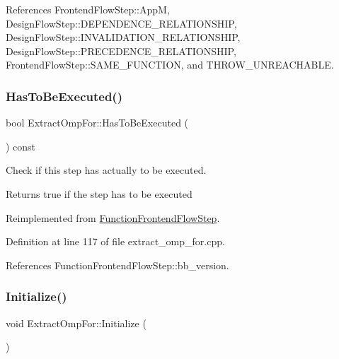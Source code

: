 References Frontend\+Flow\+Step\+::\+AppM, Design\+Flow\+Step\+::\+D\+E\+P\+E\+N\+D\+E\+N\+C\+E\+\_\+\+R\+E\+L\+A\+T\+I\+O\+N\+S\+H\+IP, Design\+Flow\+Step\+::\+I\+N\+V\+A\+L\+I\+D\+A\+T\+I\+O\+N\+\_\+\+R\+E\+L\+A\+T\+I\+O\+N\+S\+H\+IP, Design\+Flow\+Step\+::\+P\+R\+E\+C\+E\+D\+E\+N\+C\+E\+\_\+\+R\+E\+L\+A\+T\+I\+O\+N\+S\+H\+IP, Frontend\+Flow\+Step\+::\+S\+A\+M\+E\+\_\+\+F\+U\+N\+C\+T\+I\+ON, and T\+H\+R\+O\+W\+\_\+\+U\+N\+R\+E\+A\+C\+H\+A\+B\+LE.

\mbox{\label{classExtractOmpFor_ab4577fa78708af18e3d2718869797d38}} 
\subsubsection{\texorpdfstring{Has\+To\+Be\+Executed()}{HasToBeExecuted()}}
{\footnotesize\ttfamily bool Extract\+Omp\+For\+::\+Has\+To\+Be\+Executed (\begin{DoxyParamCaption}{ }\end{DoxyParamCaption}) const\hspace{0.3cm}{\ttfamily [virtual]}}



Check if this step has actually to be executed. 

\begin{DoxyReturn}{Returns}
true if the step has to be executed 
\end{DoxyReturn}


Reimplemented from \hyperlink{classFunctionFrontendFlowStep_a12e786363530aa9533e4bd9380130d75}{Function\+Frontend\+Flow\+Step}.



Definition at line 117 of file extract\+\_\+omp\+\_\+for.\+cpp.



References Function\+Frontend\+Flow\+Step\+::bb\+\_\+version.

\mbox{\label{classExtractOmpFor_aa13852248ade9c2e4518534556213692}} 
\subsubsection{\texorpdfstring{Initialize()}{Initialize()}}
{\footnotesize\ttfamily void Extract\+Omp\+For\+::\+Initialize (\begin{DoxyParamCaption}{ }\end{DoxyParamCaption})\hspace{0.3cm}{\ttfamily [virtual]}}



